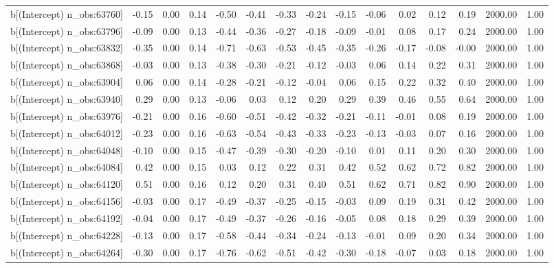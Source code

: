 \begin{table}[ht]
\begin{tabular}{rrrrrrrrrrrrrrr}
  b[(Intercept) n\_obs:63760] & -0.15 & 0.00 & 0.14 & -0.50 & -0.41 & -0.33 & -0.24 & -0.15 & -0.06 & 0.02 & 0.12 & 0.19 & 2000.00 & 1.00 \\ 
  b[(Intercept) n\_obs:63796] & -0.09 & 0.00 & 0.13 & -0.44 & -0.36 & -0.27 & -0.18 & -0.09 & -0.01 & 0.08 & 0.17 & 0.24 & 2000.00 & 1.00 \\ 
  b[(Intercept) n\_obs:63832] & -0.35 & 0.00 & 0.14 & -0.71 & -0.63 & -0.53 & -0.45 & -0.35 & -0.26 & -0.17 & -0.08 & -0.00 & 2000.00 & 1.00 \\ 
  b[(Intercept) n\_obs:63868] & -0.03 & 0.00 & 0.13 & -0.38 & -0.30 & -0.21 & -0.12 & -0.03 & 0.06 & 0.14 & 0.22 & 0.31 & 2000.00 & 1.00 \\ 
  b[(Intercept) n\_obs:63904] & 0.06 & 0.00 & 0.14 & -0.28 & -0.21 & -0.12 & -0.04 & 0.06 & 0.15 & 0.22 & 0.32 & 0.40 & 2000.00 & 1.00 \\ 
  b[(Intercept) n\_obs:63940] & 0.29 & 0.00 & 0.13 & -0.06 & 0.03 & 0.12 & 0.20 & 0.29 & 0.39 & 0.46 & 0.55 & 0.64 & 2000.00 & 1.00 \\ 
  b[(Intercept) n\_obs:63976] & -0.21 & 0.00 & 0.16 & -0.60 & -0.51 & -0.42 & -0.32 & -0.21 & -0.11 & -0.01 & 0.08 & 0.19 & 2000.00 & 1.00 \\ 
  b[(Intercept) n\_obs:64012] & -0.23 & 0.00 & 0.16 & -0.63 & -0.54 & -0.43 & -0.33 & -0.23 & -0.13 & -0.03 & 0.07 & 0.16 & 2000.00 & 1.00 \\ 
  b[(Intercept) n\_obs:64048] & -0.10 & 0.00 & 0.15 & -0.47 & -0.39 & -0.30 & -0.20 & -0.10 & 0.01 & 0.11 & 0.20 & 0.30 & 2000.00 & 1.00 \\ 
  b[(Intercept) n\_obs:64084] & 0.42 & 0.00 & 0.15 & 0.03 & 0.12 & 0.22 & 0.31 & 0.42 & 0.52 & 0.62 & 0.72 & 0.82 & 2000.00 & 1.00 \\ 
  b[(Intercept) n\_obs:64120] & 0.51 & 0.00 & 0.16 & 0.12 & 0.20 & 0.31 & 0.40 & 0.51 & 0.62 & 0.71 & 0.82 & 0.90 & 2000.00 & 1.00 \\ 
  b[(Intercept) n\_obs:64156] & -0.03 & 0.00 & 0.17 & -0.49 & -0.37 & -0.25 & -0.15 & -0.03 & 0.09 & 0.19 & 0.31 & 0.42 & 2000.00 & 1.00 \\ 
  b[(Intercept) n\_obs:64192] & -0.04 & 0.00 & 0.17 & -0.49 & -0.37 & -0.26 & -0.16 & -0.05 & 0.08 & 0.18 & 0.29 & 0.39 & 2000.00 & 1.00 \\ 
  b[(Intercept) n\_obs:64228] & -0.13 & 0.00 & 0.17 & -0.58 & -0.44 & -0.34 & -0.24 & -0.13 & -0.01 & 0.09 & 0.20 & 0.34 & 2000.00 & 1.00 \\ 
  b[(Intercept) n\_obs:64264] & -0.30 & 0.00 & 0.17 & -0.76 & -0.62 & -0.51 & -0.42 & -0.30 & -0.18 & -0.07 & 0.03 & 0.18 & 2000.00 & 1.00 \\ 

\end{tabular}
\end{table}
